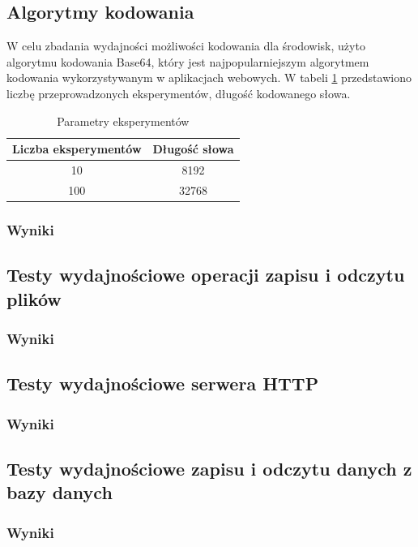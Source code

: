 \subsection{Algorytmy kodowania}
W celu zbadania wydajności możliwości kodowania dla środowisk, użyto algorytmu kodowania Base64, który jest najpopularniejszym algorytmem kodowania wykorzystywanym w aplikacjach webowych. W tabeli \ref{tab:encoding_experiments} przedstawiono liczbę przeprowadzonych eksperymentów, długość kodowanego słowa.

\begin{table}[H]
  \centering
  \begin{tabular}{|c|c|}
    \hline
    \textbf{Liczba eksperymentów} & \textbf{Długość słowa}\\ \hline
    10 & 8192 \\ \hline
    100 & 32768 \\ \hline
  \end{tabular}
  \caption{Parametry eksperymentów}
  \label{tab:encoding_experiments}
\end{table}

\subsubsection{Wyniki}

\subsection{Testy wydajnościowe operacji zapisu i odczytu plików}

\subsubsection{Wyniki}

\subsection{Testy wydajnościowe serwera HTTP}

\subsubsection{Wyniki}

\subsection{Testy wydajnościowe zapisu i odczytu danych z bazy danych}

\subsubsection{Wyniki}